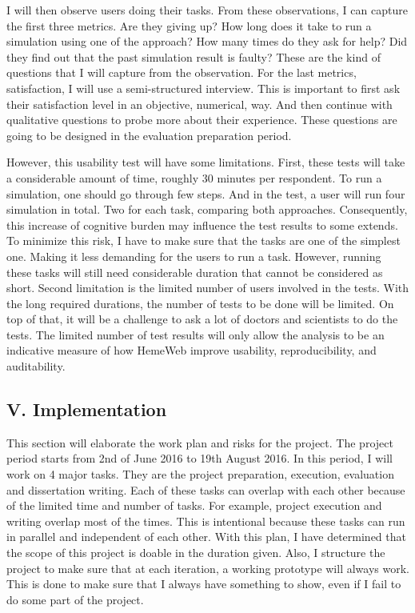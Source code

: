 \documentclass[]{article}
\begin{document}
I will then observe users doing their tasks. From these observations, I
can capture the first three metrics. Are they giving up? How long does
it take to run a simulation using one of the approach? How many times do
they ask for help? Did they find out that the past simulation result is
faulty? These are the kind of questions that I will capture from the
observation. For the last metrics, satisfaction, I will use a
semi-structured interview. This is important to first ask their
satisfaction level in an objective, numerical, way. And then continue
with qualitative questions to probe more about their experience. These
questions are going to be designed in the evaluation preparation period.

However, this usability test will have some limitations. First, these
tests will take a considerable amount of time, roughly 30 minutes per
respondent. To run a simulation, one should go through few steps. And in
the test, a user will run four simulation in total. Two for each task,
comparing both approaches. Consequently, this increase of cognitive
burden may influence the test results to some extends. To minimize this
risk, I have to make sure that the tasks are one of the simplest one.
Making it less demanding for the users to run a task. However, running
these tasks will still need considerable duration that cannot be
considered as short. Second limitation is the limited number of users
involved in the tests. With the long required durations, the number of
tests to be done will be limited. On top of that, it will be a challenge
to ask a lot of doctors and scientists to do the tests. The limited
number of test results will only allow the analysis to be an indicative
measure of how HemeWeb improve usability, reproducibility, and
auditability.

\subsection{V. Implementation}\label{v.-implementation}

This section will elaborate the work plan and risks for the project. The
project period starts from 2nd of June 2016 to 19th August 2016. In this
period, I will work on 4 major tasks. They are the project preparation,
execution, evaluation and dissertation writing. Each of these tasks can
overlap with each other because of the limited time and number of tasks.
For example, project execution and writing overlap most of the times.
This is intentional because these tasks can run in parallel and
independent of each other. With this plan, I have determined that the
scope of this project is doable in the duration given. Also, I structure
the project to make sure that at each iteration, a working prototype
will always work. This is done to make sure that I always have something
to show, even if I fail to do some part of the project.
\end{document}
